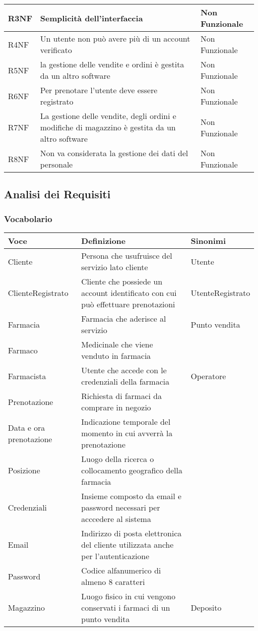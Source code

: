 \begin{tabular} {|P{1.5cm}|P{12.5cm}|P{3cm}|}
\hline
  R3NF & Semplicità dell'interfaccia & Non Funzionale\\
\hline
  R4NF & Un utente non può avere più di un account verificato & Non Funzionale\\
\hline
  R5NF & la gestione delle vendite e ordini è gestita da un altro software & Non Funzionale\\
\hline
  R6NF & Per prenotare l'utente deve essere registrato & Non Funzionale\\
\hline
  R7NF & La gestione delle vendite, degli ordini e modifiche di magazzino è gestita da un altro software & Non Funzionale\\
\hline
  R8NF & Non va considerata la gestione dei dati del personale & Non Funzionale \\
\hline
\end{tabular}

\subsection{Analisi dei Requisiti}
\subsubsection{Vocabolario}

\begin{tabular} {|P{3.5cm}|P{10.5cm}|P{3cm}|}
\hline
  \textbf{Voce} & \textbf{Definizione} & \textbf{Sinonimi}\\
\hline
  Cliente & Persona che usufruisce del servizio lato cliente & Utente \\
\hline
  ClienteRegistrato & Cliente che possiede un account identificato con cui può effettuare prenotazioni & UtenteRegistrato \\
\hline
  Farmacia & Farmacia che aderisce al servizio & Punto vendita\\
\hline
  Farmaco & Medicinale che viene venduto in farmacia & \\
\hline
  Farmacista & Utente che accede con le credenziali della farmacia & Operatore \\
\hline
  Prenotazione & Richiesta di farmaci da comprare in negozio & \\
\hline
  Data e ora prenotazione & Indicazione temporale del momento in cui avverrà la prenotazione & \\
\hline
  Posizione & Luogo della ricerca o collocamento geografico della farmacia & \\
\hline
  Credenziali & Insieme composto da email e password necessari per acccedere al sistema&\\
\hline
  Email & Indirizzo di posta elettronica del cliente utilizzata anche per l'autenticazione &\\
\hline
  Password & Codice alfanumerico di almeno 8 caratteri &\\
\hline
  Magazzino & Luogo fisico in cui vengono conservati i farmaci di un punto vendita & Deposito \\
\hline
\end{tabular}

